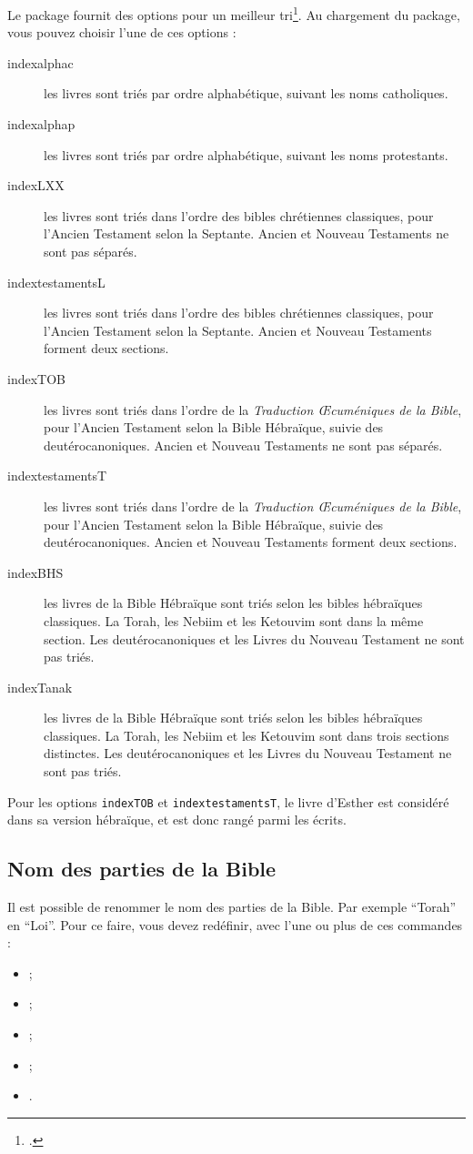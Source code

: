 \documentclass{ltxdoc}
\begin{document}
Le package fournit des options pour un meilleur tri\footcite[Pour l'Ancien Testament les protestants suivent le canon juif pour son contenu mais utilisent l'ordre du canon catholique, voir][]{canons}. Au chargement du package, vous pouvez choisir l'une de ces options :
 \begin{description}
 \item[indexalphac]les livres sont triés par ordre alphabétique, suivant les noms catholiques.
\item[indexalphap]les livres sont triés par ordre alphabétique, suivant les noms protestants.
\item[indexLXX]les livres sont triés dans l'ordre des bibles chrétiennes classiques, pour l'Ancien Testament  selon la Septante. Ancien et Nouveau Testaments ne sont pas séparés.
\item[indextestamentsL]les livres sont triés dans l'ordre des bibles chrétiennes classiques, pour l'Ancien Testament  selon la Septante. Ancien et Nouveau Testaments forment deux sections.
\item[indexTOB]les livres sont triés dans l'ordre de la \emph{Traduction Œcuméniques de la Bible}, pour l'Ancien Testament  selon la Bible Hébraïque, suivie des deutérocanoniques. Ancien et Nouveau Testaments ne sont pas séparés.
\item[indextestamentsT]les livres sont triés dans l'ordre de la \emph{Traduction Œcuméniques de la Bible}, pour l'Ancien Testament  selon la Bible Hébraïque, suivie des deutérocanoniques. Ancien et Nouveau Testaments forment deux sections.
\item[indexBHS]les livres de la Bible Hébraïque sont triés selon les bibles hébraïques classiques. La Torah, les Nebiim et les Ketouvim sont dans la même section. Les deutérocanoniques et les Livres du Nouveau Testament ne sont pas triés.
\item[indexTanak]les livres de la Bible Hébraïque sont triés selon les bibles hébraïques classiques. La Torah, les Nebiim et les Ketouvim sont dans trois sections distinctes. Les deutérocanoniques et les Livres du Nouveau Testament ne sont pas triés.
\end{description}

Pour les options \verb|indexTOB| et \verb|indextestamentsT|, le livre d'Esther est considéré dans sa version hébraïque, et est donc rangé parmi les  écrits.
\subsection{Nom des parties de la Bible}
Il est possible de renommer le nom des parties de la Bible. Par exemple \enquote{Torah} en \enquote{Loi}.
Pour ce faire, vous devez redéfinir, avec   l'une ou plus de ces commandes :
 \begin{itemize}
 \item {} ;
 \item {} ;
 \item {} ;
 \item {};
 \item {}.
\end{itemize}
\end{document}
